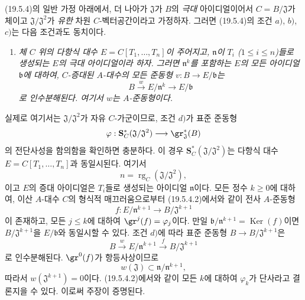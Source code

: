 \begin{remark}[19.5.5]
\label{0.19.5.5-fr}
(19.5.4)의 일반 가정 아래에서, 더 나아가 $\mathfrak J$가 $B$의
\emph{극대} 아이디얼이어서 $C=B/\mathfrak J$가 체이고
$\mathfrak J/\mathfrak J^2$가 \emph{유한} 차원 $C$-벡터공간이라고
가정하자. 그러면 (19.5.4)의 조건 $a)$, $b)$, $c)$는 다음 조건과도
동치이다.
\begin{enumerate}
  \item[d)] \emph{체 $C$ 위의 다항식 대수
  $E=C[T_1,\ldots,T_n]$이 주어지고, $\mathfrak n$이
  $T_i$ ($1\leq i\leq n$)들로 생성되는 $E$의 극대 아이디얼이라
  하자. 그러면 $\mathfrak n^k$를 포함하는 $E$의 모든 아이디얼
  $\mathfrak b$에 대하여, $C$-증대된 $A$-대수의 모든 준동형
  $v:B\to E/\mathfrak b$는}
  \[
    B\xrightarrow{w}E/\mathfrak n^k\longrightarrow E/\mathfrak b
  \]
  \emph{로 인수분해된다. 여기서 $w$는 $A$-준동형이다.}
\end{enumerate}

실제로 여기서는 $\mathfrak J/\mathfrak J^2$가 자유 $C$-가군이므로,
조건 $d)$가 표준 준동형
\[
  \varphi:\mathbf S_C^*(\mathfrak J/\mathfrak J^2)
  \longrightarrow\gr_{\mathfrak J}^*(B)
\]
의 전단사성을 함의함을 확인하면 충분하다. 이 경우
$\mathbf S_C^*(\mathfrak J/\mathfrak J^2)$는 다항식 대수
$E=C[T_1,\ldots,T_n]$과 동일시된다. 여기서
\[
  n=\operatorname{rg}_C(\mathfrak J/\mathfrak J^2),
\]
이고 $E$의 증대 아이디얼은 $T_i$들로 생성되는 아이디얼
$\mathfrak n$이다. 모든 정수 $k\geq0$에 대하여, 이산 $A$-대수
$C$의 형식적 매끄러움으로부터 (19.5.4.2)에서와 같이 전사
$A$-준동형
\[
  f:E/\mathfrak n^{k+1}\longrightarrow B/\mathfrak J^{k+1}
\]
이 존재하고, 모든 $j\leq k$에 대하여
$\gr^j(f)=\varphi_j$이다. 만일
$\mathfrak b/\mathfrak n^{k+1}=\operatorname{Ker}(f)$이면
$B/\mathfrak J^{k+1}$을 $E/\mathfrak b$와 동일시할 수 있다. 조건
$d)$에 따라 표준 준동형 $B\to B/\mathfrak J^{k+1}$은
\[
  B\xrightarrow{w}E/\mathfrak n^{k+1}
  \xrightarrow{f}B/\mathfrak J^{k+1}
\]
로 인수분해된다. $\gr^0(f)$가 항등사상이므로
\[
  w(\mathfrak J)\subset\mathfrak n/\mathfrak n^{k+1},
\]
따라서 $w(\mathfrak J^{k+1})=0$이다. (19.5.4.2)에서와 같이
모든 $k$에 대하여 $\varphi_k$가 단사라고 결론지을 수 있다. 이로써
주장이 증명된다.
\end{remark}

